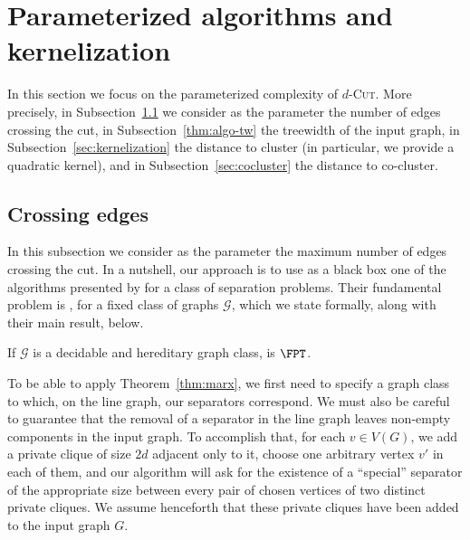 \section{Parameterized algorithms and kernelization}
\label{sec:param}

In this section we focus on the parameterized complexity of \textsc{$d$-Cut}. More precisely, in Subsection~\ref{sec:crossing-edges} we consider as the parameter the number of edges crossing the cut, in Subsection~\ref{thm:algo-tw} the treewidth of the input graph, in Subsection~\ref{sec:kernelization} the distance to cluster (in particular, we provide a quadratic kernel), and in Subsection~\ref{sec:cocluster} the distance to co-cluster.


\subsection{Crossing edges}
\label{sec:crossing-edges}


In this subsection we consider as the parameter the maximum number of edges crossing the cut. In a nutshell, our approach is to use as a black box one of the algorithms presented by \cite{marx_treewidth_reduction} for a class of separation problems. Their fundamental problem is , for a fixed class of graphs $\mathcal{G}$, which we state formally, along with their main result, below.



\begin{theorem}
    \label{thm:marx}
    If $\mathcal{G}$ is a decidable and hereditary graph class,  is $\FPT$.
\end{theorem}

To be able to apply Theorem~\ref{thm:marx}, we first need to specify a graph class to which, on the line graph, our separators correspond. We must also be careful to guarantee that the removal of a separator in the line graph leaves non-empty components in the input graph. To accomplish that, for each $v \in V(G)$, we add a private clique of size $2d$ adjacent only to it, choose one arbitrary vertex $v'$ in each of them, and our algorithm will ask for the existence of a ``special'' separator of the appropriate size between every pair of chosen vertices of two distinct private cliques. We assume henceforth that these private cliques have been added to the input graph $G$.

